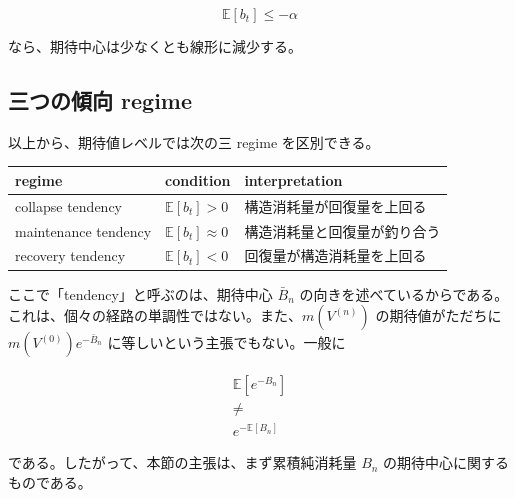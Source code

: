 \documentclass[12pt,a4paper]{article}
\begin{document}
\[
\mathbb E[b_{t}] \le -\alpha
\]

なら、期待中心は少なくとも線形に減少する。

\subsection{三つの傾向 regime}\label{ux4e09ux3064ux306eux50beux5411-regime}

以上から、期待値レベルでは次の三 regime を区別できる。

{\def\LTcaptype{table} %
\begin{longtable}[]{@{}
  >{\raggedright\arraybackslash}p{}
  >{\raggedright\arraybackslash}p{}
  >{\raggedright\arraybackslash}p{}@{}}
\toprule\noalign{}
\begin{minipage}[b]{\linewidth}\raggedright
regime
\end{minipage} & \begin{minipage}[b]{\linewidth}\raggedright
condition
\end{minipage} & \begin{minipage}[b]{\linewidth}\raggedright
interpretation
\end{minipage} \\
\midrule\noalign{}
\endhead
\bottomrule\noalign{}
\endlastfoot
collapse tendency & \(\mathbb E[b_t] > 0\) & 構造消耗量が回復量を上回る \\
maintenance tendency & \(\mathbb E[b_t] \approx 0\) & 構造消耗量と回復量が釣り合う \\
recovery tendency & \(\mathbb E[b_t] < 0\) & 回復量が構造消耗量を上回る \\
\end{longtable}
}

ここで「tendency」と呼ぶのは、期待中心 \(\bar B_{n}\) の向きを述べているからである。これは、個々の経路の単調性ではない。また、\(m(V^{(n)})\) の期待値がただちに \(m(V^{(0)})e^{-\bar B_{n}}\) に等しいという主張でもない。一般に

\[
\begin{aligned}
\mathbb E[e^{-B_{n}}] \\
\ne \\
e^{-\mathbb E[B_{n}]}
\end{aligned}
\]

である。したがって、本節の主張は、まず累積純消耗量 \(B_{n}\) の期待中心に関するものである。
\end{document}

